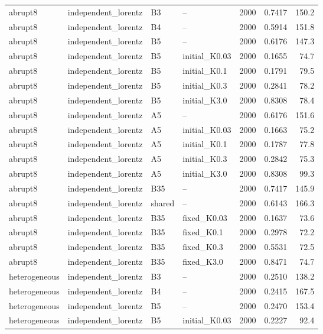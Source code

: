 \begin{longtable}{llllrrr}
abrupt8 & independent\_lorentz & B3 & -- & 2000 & 0.7417 & 150.2 \\
abrupt8 & independent\_lorentz & B4 & -- & 2000 & 0.5914 & 151.8 \\
\rowcolor{oursbg}
abrupt8 & independent\_lorentz & B5 & -- & 2000 & 0.6176 & 147.3 \\
\rowcolor{oursbg}
abrupt8 & independent\_lorentz & B5 & initial\_K0.03 & 2000 & 0.1655 & 74.7 \\
\rowcolor{oursbg}
abrupt8 & independent\_lorentz & B5 & initial\_K0.1 & 2000 & 0.1791 & 79.5 \\
\rowcolor{oursbg}
abrupt8 & independent\_lorentz & B5 & initial\_K0.3 & 2000 & 0.2841 & 78.2 \\
\rowcolor{oursbg}
abrupt8 & independent\_lorentz & B5 & initial\_K3.0 & 2000 & 0.8308 & 78.4 \\
abrupt8 & independent\_lorentz & A5 & -- & 2000 & 0.6176 & 151.6 \\
abrupt8 & independent\_lorentz & A5 & initial\_K0.03 & 2000 & 0.1663 & 75.2 \\
abrupt8 & independent\_lorentz & A5 & initial\_K0.1 & 2000 & 0.1787 & 77.8 \\
abrupt8 & independent\_lorentz & A5 & initial\_K0.3 & 2000 & 0.2842 & 75.3 \\
abrupt8 & independent\_lorentz & A5 & initial\_K3.0 & 2000 & 0.8308 & 99.3 \\
abrupt8 & independent\_lorentz & B35 & -- & 2000 & 0.7417 & 145.9 \\
abrupt8 & independent\_lorentz & shared & -- & 2000 & 0.6143 & 166.3 \\
abrupt8 & independent\_lorentz & B35 & fixed\_K0.03 & 2000 & 0.1637 & 73.6 \\
abrupt8 & independent\_lorentz & B35 & fixed\_K0.1 & 2000 & 0.2978 & 72.2 \\
abrupt8 & independent\_lorentz & B35 & fixed\_K0.3 & 2000 & 0.5531 & 72.5 \\
abrupt8 & independent\_lorentz & B35 & fixed\_K3.0 & 2000 & 0.8471 & 74.7 \\
heterogeneous & independent\_lorentz & B3 & -- & 2000 & 0.2510 & 138.2 \\
heterogeneous & independent\_lorentz & B4 & -- & 2000 & 0.2415 & 167.5 \\
\rowcolor{oursbg}
heterogeneous & independent\_lorentz & B5 & -- & 2000 & 0.2470 & 153.4 \\
\rowcolor{oursbg}
heterogeneous & independent\_lorentz & B5 & initial\_K0.03 & 2000 & 0.2227 & 92.4 \\

\end{longtable}

